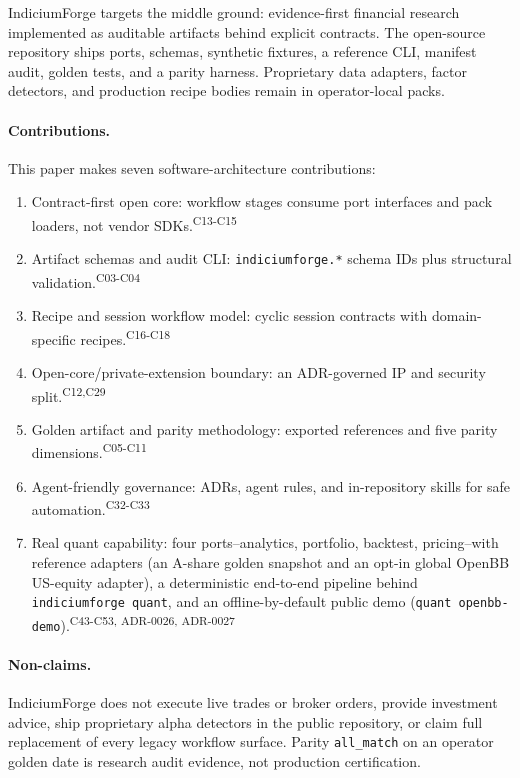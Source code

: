 \documentclass[11pt]{article}
\newcommand{\schema}[1]{\texttt{#1}}
\newcommand{\claim}[1]{\textsuperscript{\textsf{#1}}}
\begin{document}
IndiciumForge targets the middle ground: evidence-first financial research implemented as
auditable artifacts behind explicit contracts. The open-source repository ships ports,
schemas, synthetic fixtures, a reference CLI, manifest audit, golden tests, and a parity
harness. Proprietary data adapters, factor detectors, and production recipe bodies remain
in operator-local packs.

\paragraph{Contributions.}
This paper makes seven software-architecture contributions:
\begin{enumerate}[leftmargin=*]
  \item Contract-first open core: workflow stages consume port interfaces and pack loaders, not vendor SDKs.\claim{C13-C15}
  \item Artifact schemas and audit CLI: \schema{indiciumforge.*} schema IDs plus structural validation.\claim{C03-C04}
  \item Recipe and session workflow model: cyclic session contracts with domain-specific recipes.\claim{C16-C18}
  \item Open-core/private-extension boundary: an ADR-governed IP and security split.\claim{C12,C29}
  \item Golden artifact and parity methodology: exported references and five parity dimensions.\claim{C05-C11}
  \item Agent-friendly governance: ADRs, agent rules, and in-repository skills for safe automation.\claim{C32-C33}
  \item Real quant capability: four ports--analytics, portfolio, backtest, pricing--with reference adapters (an A-share golden snapshot and an opt-in global OpenBB US-equity adapter), a deterministic end-to-end pipeline behind \texttt{indiciumforge quant}, and an offline-by-default public demo (\texttt{quant openbb-demo}).\claim{C43-C53, ADR-0026, ADR-0027}
\end{enumerate}

\paragraph{Non-claims.}
IndiciumForge does not execute live trades or broker orders, provide investment advice,
ship proprietary alpha detectors in the public repository, or claim full replacement of
every legacy workflow surface. Parity \texttt{all\_match} on an operator golden date is
research audit evidence, not production certification.
\end{document}

